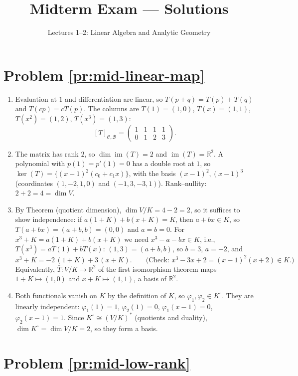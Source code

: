 \documentclass[11pt]{article}
\title{Midterm Exam --- Solutions}
\author{Lectures 1--2: Linear Algebra and Analytic Geometry}
\date{}
\DeclareMathOperator{\im}{im}
\begin{document}
\maketitle

\section*{Problem \ref{pr:mid-linear-map}}

\begin{enumerate}[label=(\alph*)]
    \item Evaluation at $1$ and differentiation are linear, so $T(p + q) = T(p) + T(q)$ and $T(cp) = cT(p)$. The columns are $T(1) = (1, 0)$, $T(x) = (1, 1)$, $T(x^2) = (1, 2)$, $T(x^3) = (1, 3)$:
    \[[T]_{\mathcal{C}, \mathcal{B}} = \begin{pmatrix} 1 & 1 & 1 & 1 \\ 0 & 1 & 2 & 3 \end{pmatrix}.\]
    \item The matrix has rank $2$, so $\dim \im(T) = 2$ and $\im(T) = \mathbb{R}^2$. A polynomial with $p(1) = p'(1) = 0$ has a double root at $1$, so $\ker(T) = \{(x - 1)^2(c_0 + c_1x)\}$, with the basis $(x - 1)^2, (x - 1)^3$ (coordinates $(1, -2, 1, 0)$ and $(-1, 3, -3, 1)$). Rank--nullity: $2 + 2 = 4 = \dim V$.
    \item By Theorem (quotient dimension), $\dim V/K = 4 - 2 = 2$, so it suffices to show independence: if $a(1 + K) + b(x + K) = K$, then $a + bx \in K$, so $T(a + bx) = (a + b, b) = (0, 0)$ and $a = b = 0$. For $x^3 + K = a(1 + K) + b(x + K)$ we need $x^3 - a - bx \in K$, i.e., $T(x^3) = aT(1) + bT(x)$: $(1, 3) = (a + b, b)$, so $b = 3$, $a = -2$, and
    \[x^3 + K = -2\,(1 + K) + 3\,(x + K). \qquad \text{(Check: } x^3 - 3x + 2 = (x - 1)^2(x + 2) \in K.)\]
    Equivalently, $\bar T: V/K \to \mathbb{R}^2$ of the first isomorphism theorem maps $1 + K \mapsto (1, 0)$ and $x + K \mapsto (1, 1)$, a basis of $\mathbb{R}^2$.
    \item Both functionals vanish on $K$ by the definition of $K$, so $\varphi_1, \varphi_2 \in K^\circ$. They are linearly independent: $\varphi_1(1) = 1$, $\varphi_2(1) = 0$, $\varphi_1(x - 1) = 0$, $\varphi_2(x - 1) = 1$. Since $K^\circ \cong (V/K)^*$ (quotients and duality), $\dim K^\circ = \dim V/K = 2$, so they form a basis.
\end{enumerate}

\section*{Problem \ref{pr:mid-low-rank}}
\end{document}
